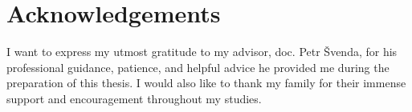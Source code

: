 \chapter*{Acknowledgements}
\noindent
I want to express my utmost gratitude to my advisor, doc. Petr Švenda, for his professional guidance, patience, and helpful advice he provided me during the preparation of this thesis. I would also like to thank my family for their immense support and encouragement throughout my studies.